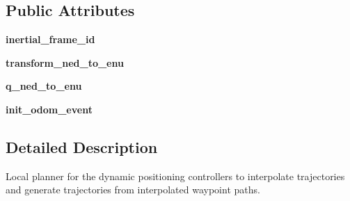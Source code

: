\subsection*{Public Attributes}
\begin{DoxyCompactItemize}
\item 
\mbox{\label{classuuv__control__interfaces_1_1dp__controller__local__planner_1_1DPControllerLocalPlanner_a5a6cc0e2d5d1c42066b112e0f025c61c}} 
{\bfseries inertial\+\_\+frame\+\_\+id}
\item 
\mbox{\label{classuuv__control__interfaces_1_1dp__controller__local__planner_1_1DPControllerLocalPlanner_ad3a8c5ab28046c40d370ed1d2832946b}} 
{\bfseries transform\+\_\+ned\+\_\+to\+\_\+enu}
\item 
\mbox{\label{classuuv__control__interfaces_1_1dp__controller__local__planner_1_1DPControllerLocalPlanner_a5b97450dceb16453b500e1f6a550c35a}} 
{\bfseries q\+\_\+ned\+\_\+to\+\_\+enu}
\item 
\mbox{\label{classuuv__control__interfaces_1_1dp__controller__local__planner_1_1DPControllerLocalPlanner_a69cf51ff8072fafa937f4ffe3467a5a4}} 
{\bfseries init\+\_\+odom\+\_\+event}
\end{DoxyCompactItemize}


\subsection{Detailed Description}
\begin{DoxyVerb}Local planner for the dynamic positioning controllers to interpolate
trajectories and generate trajectories from interpolated waypoint paths.
\end{DoxyVerb}
 


